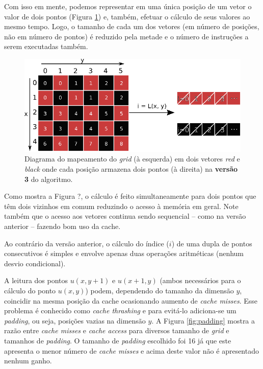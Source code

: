 Com isso em mente, podemos representar em uma única posição de um vetor o valor de dois pontos (Figura \ref{fig:grid-v3}) e, também, efetuar o cálculo de seus valores ao mesmo tempo. Logo, o tamanho de cada um dos vetores (em número de posições, não em número de pontos) é reduzido pela metade e o número de instruções a serem executadas também.

\begin{figure}[h]
    \centering
    \includegraphics[width=.8\textwidth]{figures/grid-v3}

    \caption{Diagrama do mapeamento do \textit{grid} (à esquerda) em dois vetores \textit{red} e \textit{black} onde cada posição armazena dois pontos (à direita) na \textbf{versão 3} do algoritmo.}
    \label{fig:grid-v3}
\end{figure}

Como mostra a Figura ?, o cálculo é feito simultaneamente para dois pontos que têm dois vizinhos em comum reduzindo o acesso à memória em geral. Note também que o acesso aos vetores continua sendo sequencial -- como na versão anterior -- fazendo bom uso da cache.

Ao contrário da versão anterior, o cálculo do índice ($i$) de uma dupla de pontos consecutivos é simples e envolve apenas duas operações aritméticas (nenhum desvio condicional).

A leitura dos pontos $u(x, y+1)$ e $u(x+1, y)$ (ambos necessários para o cálculo do ponto $u(x, y)$) podem, dependendo do tamanho da dimensão $y$, coincidir na mesma posição da cache ocasionando aumento de \textit{cache misses}. Esse problema é conhecido como \textit{cache thrashing} \cite{cachethrashing} e para evitá-lo adiciona-se um \textit{padding}, ou seja, posições vazias na dimensão $y$. A Figura \ref{fig:padding} mostra a razão entre \textit{cache misses} e \textit{cache access} para diversos tamanho de \textit{grid} e tamanhos de \textit{padding}. O tamanho de \textit{padding} escolhido foi 16 já que este apresenta o menor número de \textit{cache misses} e acima deste valor não é apresentado nenhum ganho.

